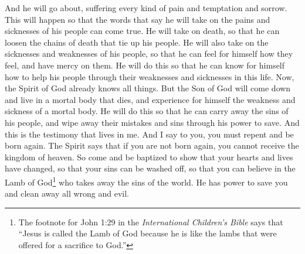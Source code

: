 \bverse \iffalse And he shall go forth, suffering pains and afflictions and temptations of every kind; and this that the word might be fulfilled which saith he will take upon him the pains and the sicknesses of his people. \fi
And he will go about, suffering every kind of pain and temptation and sorrow. This will happen so that the words that say he will take on the pains and sicknesses of his people can come true.
\bverse \iffalse And he will take upon him death, that he may loose the bands of death which bind his people; and he will take upon him their infirmities, that his bowels may be filled with mercy, according to the flesh, that he may know according to the flesh how to succor his people according to their infirmities. \fi
He will take on death, so that he can loosen the chains of death that tie up his people. He will also take on the sicknesses and weaknesses of his people, so that he can feel for himself how they feel, and have mercy on them. He will do this so that he can know for himself how to help his people through their weaknesses and sicknesses in this life.
\bverse \iffalse Now the Spirit knoweth all things; nevertheless the Son of God suffereth according to the flesh that he might take upon him the sins of his people, that he might blot out their transgressions according to the power of his deliverance; and now behold, this is the testimony which is in me. \fi
Now, the Spirit of God already knows all things. But the Son of God will come down and live in a mortal body that dies, and experience for himself the weakness and sickness of a mortal body. He will do this so that he can carry away the sins of his people, and wipe away their mistakes and sins through his power to save. And this is the testimony that lives in me.
\bverse \iffalse Now I say unto you that ye must repent, and be born again; for the Spirit saith if ye are not born again ye cannot inherit the kingdom of heaven; therefore come and be baptized unto repentance, that ye may be washed from your sins, that ye may have faith on the Lamb of God, who taketh away the sins of the world, who is mighty to save and to cleanse from all unrighteousness. \fi
And I say to you, you must repent and be born again. The Spirit says that if you are not born again, you cannot receive the kingdom of heaven. So come and be baptized to show that your hearts and lives have changed, so that your sins can be washed off, so that you can believe in the Lamb of God\footnote{The footnote for John 1:29 in the \textit{International Children's Bible} says that ``Jesus is called the Lamb of God because he is like the lambs that were offered for a sacrifice to God.''} who takes away the sins of the world. He has power to save you and clean away all wrong and evil.
